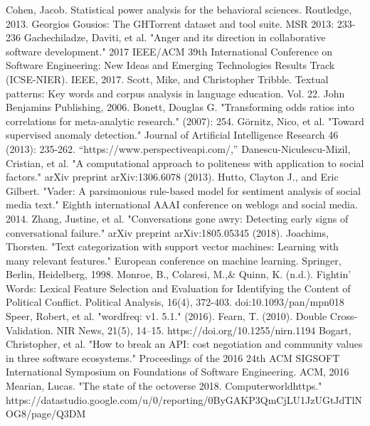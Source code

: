 \documentclass[conference]{IEEEtran}
\begin{document}
\begin{thebibliography}{00}
 Cohen, Jacob. Statistical power analysis for the behavioral sciences. Routledge, 2013.
 Georgios Gousios: The GHTorrent dataset and tool suite. MSR 2013: 233-236
 Gachechiladze, Daviti, et al. "Anger and its direction in collaborative software development." 2017 IEEE/ACM 39th International Conference on Software Engineering: New Ideas and Emerging Technologies Results Track (ICSE-NIER). IEEE, 2017.
 Scott, Mike, and Christopher Tribble. Textual patterns: Key words and corpus analysis in language education. Vol. 22. John Benjamins Publishing, 2006.
 Bonett, Douglas G. "Transforming odds ratios into correlations for meta-analytic research." (2007): 254.
 Görnitz, Nico, et al. "Toward supervised anomaly detection." Journal of Artificial Intelligence Research 46 (2013): 235-262. 
  “https://www.perspectiveapi.com/,”
 Danescu-Niculescu-Mizil, Cristian, et al. "A computational approach to politeness with application to social factors." arXiv preprint arXiv:1306.6078 (2013).
 Hutto, Clayton J., and Eric Gilbert. "Vader: A parsimonious rule-based model for sentiment analysis of social media text." Eighth international AAAI conference on weblogs and social media. 2014.
 Zhang, Justine, et al. "Conversations gone awry: Detecting early signs of conversational failure." arXiv preprint arXiv:1805.05345 (2018).
 Joachims, Thorsten. "Text categorization with support vector machines: Learning with many relevant features." European conference on machine learning. Springer, Berlin, Heidelberg, 1998.
 Monroe, B., Colaresi, M.,\& Quinn, K. (n.d.). Fightin' Words: Lexical Feature Selection and Evaluation for Identifying the Content of Political Conflict. Political Analysis, 16(4), 372-403. doi:10.1093/pan/mpn018
 Speer, Robert, et al. "wordfreq: v1. 5.1." (2016).
 Fearn, T. (2010). Double Cross-Validation. NIR News, 21(5), 14–15. https://doi.org/10.1255/nirn.1194
 Bogart, Christopher, et al. "How to break an API: cost negotiation and community values in three software ecosystems." Proceedings of the 2016 24th ACM SIGSOFT International Symposium on Foundations of Software Engineering. ACM, 2016
 Mearian, Lucas. "The state of the octoverse 2018. Computerworldhttps."
 https://datastudio.google.com/u/0/reporting/0ByGAKP3QmCjLU1JzUGtJdTlNOG8/page/Q3DM

\end{thebibliography}
\end{document}
